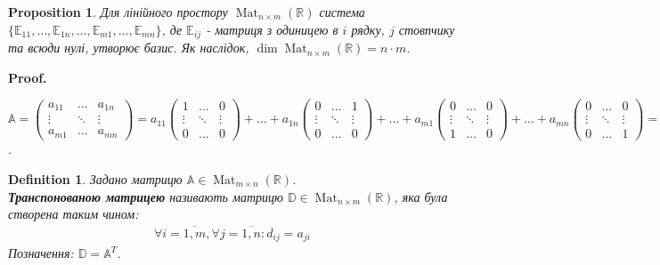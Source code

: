 \documentclass[a4paper, 10pt]{article}
\makeatletter
\theoremstyle{theoremdd}
\newtheorem{definition}[theorem]{Definition}
\newtheorem{proposition}[theorem]{Proposition}
\DeclareMathOperator{\Mat}{Mat}
\renewenvironment{proof}[1][Proof.\\]{\par
\pushQED{\hfill \qed}%
\normalfont \topsep6\p@\@plus6\p@\relax
\trivlist
\item\relax
{\bfseries
#1\@addpunct{.}}\hspace\labelsep\ignorespaces
}{%
\popQED\endtrivlist\@endpefalse
}
\makeatother
\begin{document}
	\begin{proposition}
	Для лінійного простору $\Mat_{n \times m}(\mathbb{R})$ система $\{\mathbb{E}_{11},\dots, \mathbb{E}_{1n},\dots, \mathbb{E}_{m1}, \dots, \mathbb{E}_{mn}\}$, де $\mathbb{E}_{ij}$ - матриця з одиницею в $i$ рядку, $j$ стовпчику та всюди нулі, утворює базис. Як наслідок, $\dim \Mat_{n \times m}(\mathbb{R}) = n \cdot m$.
	\end{proposition}
	
	\begin{proof}
	$\mathbb{A} = \begin{pmatrix}
	a_{11} & \dots & a_{1n} \\
	\vdots & \ddots & \vdots \\
	a_{m1} & \dots & a_{mn} 
	\end{pmatrix} = a_{11}\begin{pmatrix}
	1 & \dots & 0 \\
	\vdots & \ddots & \vdots \\
	0 & \dots & 0 
	\end{pmatrix} + \dots + a_{1n}\begin{pmatrix}
	0 & \dots & 1 \\
	\vdots & \ddots & \vdots \\
	0 & \dots & 0 
	\end{pmatrix} + \dots + a_{m1}\begin{pmatrix}
	0 & \dots & 0 \\
	\vdots & \ddots & \vdots \\
	1 & \dots & 0 
	\end{pmatrix} + \dots + a_{mn}\begin{pmatrix}
	0 & \dots & 0 \\
	\vdots & \ddots & \vdots \\
	0 & \dots & 1 
	\end{pmatrix} = a_{11}\mathbb{E}_{11} + \dots + a_{1n}\mathbb{E}_{1n} + \dots + a_{m1}\mathbb{E}_{m1} + \dots + a_{mn}\mathbb{E}_{mn}$.
	\end{proof}
	
	\begin{definition}
	Задано матрицю $\mathbb{A} \in \Mat_{m \times n}(\mathbb{R})$.\\
	\textbf{Транспонованою матрицею} називають матрицю $\mathbb{D} \in \Mat_{n \times m}(\mathbb{R})$, яка була створена таким чином:
	\begin{align*}
	\forall i = \overline{1,m}, \forall j = \overline{1,n}: d_{ij} = a_{ji}
	\end{align*}
	Позначення: $\mathbb{D} = \mathbb{A}^T$.
	\end{definition}
	
\end{document}
